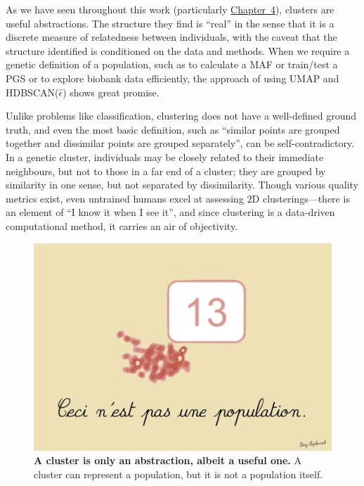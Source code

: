 As we have seen throughout this work (particularly \hyperref[chap:chapter4]{Chapter~4}), clusters are useful abstractions. The structure they find is ``real'' in the sense that it is a discrete measure of relatedness between individuals, with the caveat that the structure identified is conditioned on the data and methods. When we require a genetic definition of a population, such as to calculate a MAF or train/test a PGS or to explore biobank data efficiently, the approach of using UMAP and HDBSCAN($\hat{\epsilon}$) shows great promise.

Unlike problems like classification, clustering does not have a well-defined ground truth, and even the most basic definition, such as ``similar points are grouped together and dissimilar points are grouped separately'', can be self-contradictory\citep{ben-david_clustering_2018}. In a genetic cluster, individuals may be closely related to their immediate neighbours, but not to those in a far end of a cluster; they are grouped by similarity in one sense, but not separated by dissimilarity. Though various quality metrics exist, even untrained humans excel at assessing $2$D clusterings\citep{lewis_human_2012}---there is an element of ``I know it when I see it'', and since clustering is a data-driven computational method, it carries an air of objectivity. %


\begin{figure}[h]
\centering
    \includegraphics[width=0.75\linewidth]{main_figures/discussion/magritte.png}
\caption[The treachery of clustering]{\textbf{A cluster is only an abstraction, albeit a useful one.} A cluster can represent a population, but it is not a population itself.}
\label{fig:magritte}
\end{figure}

